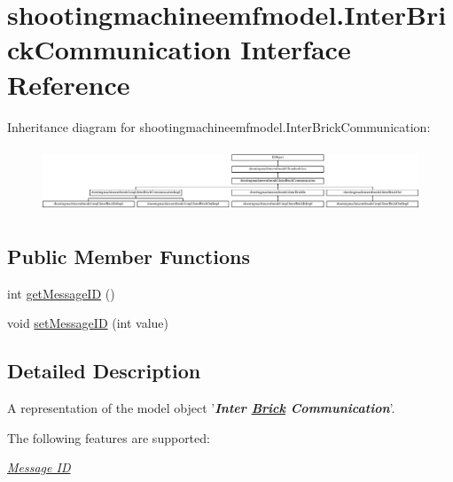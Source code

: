 \hypertarget{interfaceshootingmachineemfmodel_1_1_inter_brick_communication}{\section{shootingmachineemfmodel.\-Inter\-Brick\-Communication Interface Reference}
\label{interfaceshootingmachineemfmodel_1_1_inter_brick_communication}
}
Inheritance diagram for shootingmachineemfmodel.\-Inter\-Brick\-Communication\-:\begin{figure}[H]
\begin{center}
\leavevmode
\includegraphics[height=1.955307cm]{interfaceshootingmachineemfmodel_1_1_inter_brick_communication}
\end{center}
\end{figure}
\subsection*{Public Member Functions}
\begin{DoxyCompactItemize}
\item 
int \hyperlink{interfaceshootingmachineemfmodel_1_1_inter_brick_communication_a41d056eedfdbeee649538c4be46eed46}{get\-Message\-I\-D} ()
\item 
void \hyperlink{interfaceshootingmachineemfmodel_1_1_inter_brick_communication_a4b06bae52775967e8a31dd5413ae1412}{set\-Message\-I\-D} (int value)
\end{DoxyCompactItemize}


\subsection{Detailed Description}
A representation of the model object '{\itshape {\bfseries Inter \hyperlink{interfaceshootingmachineemfmodel_1_1_brick}{Brick} Communication}}'.

The following features are supported\-: 
\begin{DoxyItemize}
\item \hyperlink{interfaceshootingmachineemfmodel_1_1_inter_brick_communication_a41d056eedfdbeee649538c4be46eed46}{{\itshape Message I\-D}} 
\end{DoxyItemize}

